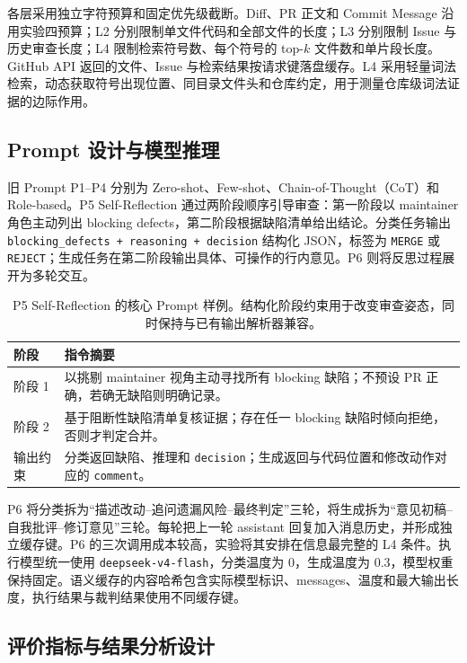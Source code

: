 \documentclass{experimentreport}
\begin{document}
{各层采用独立字符预算和固定优先级截断。Diff、PR 正文和 Commit Message 沿用实验四预算；L2 分别限制单文件代码和全部文件的长度；L3 分别限制 Issue 与历史审查长度；L4 限制检索符号数、每个符号的 top-$k$ 文件数和单片段长度。GitHub API 返回的文件、Issue 与检索结果按请求键落盘缓存。L4 采用轻量词法检索，动态获取符号出现位置、同目录文件头和仓库约定，用于测量仓库级词法证据的边际作用。

\subsection{Prompt 设计与模型推理}

旧 Prompt P1--P4 分别为 Zero-shot、Few-shot、Chain-of-Thought（CoT）和 Role-based。P5 Self-Reflection 通过两阶段顺序引导审查：第一阶段以 maintainer 角色主动列出 blocking defects，第二阶段根据缺陷清单给出结论。分类任务输出 \texttt{blocking\_defects + reasoning + decision} 结构化 JSON，标签为 \texttt{MERGE} 或 \texttt{REJECT}；生成任务在第二阶段输出具体、可操作的行内意见。P6 则将反思过程展开为多轮交互。

\begin{table}[H]
\centering
\caption{P5 Self-Reflection 的核心 Prompt 样例。结构化阶段约束用于改变审查姿态，同时保持与已有输出解析器兼容。}
\label{tab:p5-sample}
\small
\begin{tabular}{p{}p{}}
\toprule
阶段 & 指令摘要 \\
\midrule
阶段 1 & 以挑剔 maintainer 视角主动寻找所有 blocking 缺陷；不预设 PR 正确，若确无缺陷则明确记录。 \\
阶段 2 & 基于阻断性缺陷清单复核证据；存在任一 blocking 缺陷时倾向拒绝，否则才判定合并。 \\
输出约束 & 分类返回缺陷、推理和 \texttt{decision}；生成返回与代码位置和修改动作对应的 \texttt{comment}。 \\
\bottomrule
\end{tabular}
\end{table}

P6 将分类拆为“描述改动--追问遗漏风险--最终判定”三轮，将生成拆为“意见初稿--自我批评--修订意见”三轮。每轮把上一轮 assistant 回复加入消息历史，并形成独立缓存键。P6 的三次调用成本较高，实验将其安排在信息最完整的 L4 条件。执行模型统一使用 \texttt{deepseek-v4-flash}，分类温度为 0，生成温度为 0.3，模型权重保持固定。语义缓存的内容哈希包含实际模型标识、messages、温度和最大输出长度，执行结果与裁判结果使用不同缓存键。

\subsection{评价指标与结果分析设计}

}
\end{document}
